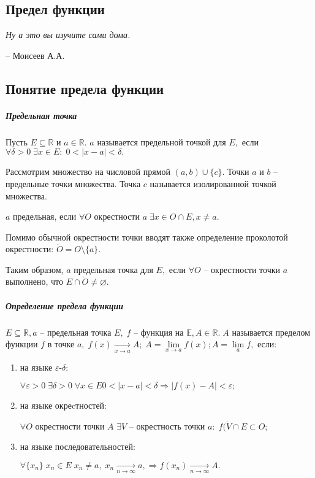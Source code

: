 \begin{center}
\section{\LARGE{\bf Предел функции}}
\end{center}
\epigraph{\textit{Ну а это вы изучите сами дома.}}
{-- Моисеев А.А.}
\subsection{Понятие предела функции}
\subparagraph{Предельная точка}
\begin{Definition}
Пусть $E\subseteq\mathbb{R}$ и $a\in\mathbb{R}.$ $a$ называется предельной точкой для $E,$ если $\forall\delta> 0\;\exists x\in E: \; 0<\mid x-a\mid<\delta.$
\end{Definition}

Рассмотрим множество на числовой прямой $(a, b)\cup\{c\}.$ Точки $a$ и $b$ -- предельные точки множества. Точка $c$ называется изолированной точкой множества.



$a$ предельная, если $\forall O$ окрестности $a \; \exists x\in O\cap E, x \neq a.$

Помимо обычной окрестности точки вводят также определение проколотой окрестности: $\dot{O} = O\setminus\{a\}.$

Таким образом, $a$ предельная точка для $E,$ если $\forall O$ -- окрестности точки $a$ выполнено, что $E\cap\dot{O}\neq\varnothing.$

\subparagraph{Определение предела функции}

\begin{Definition}
$E\subseteq\mathbb{R}, a$ -- предельная точка $E, \; f$ -- функция на $\mathbb{E}, A\in\mathbb{R}. \; A$ называется пределом функции $f$ в точке $a, \;f(x)\xrightarrow[x\rightarrow a]{} A; \; A=\lim\limits_{x\rightarrow a} f(x); A=\lim\limits_{a}f,$ если:
\begin{enumerate}
\item на языке $\varepsilon$-$\delta:$

$\forall \varepsilon > 0 \;\exists \delta > 0\;\forall x\in E 0<\mid x-a\mid<\delta \Rightarrow \mid f(x)-A\mid<\varepsilon;$

\item на языке окреcтностей$:$

$\forall O$ окрестности точки $A$ $\exists V$ -- окрестность точки $a: \; f(\dot{V}\cap E \subset O;$

\item на языке последовательностей$:$

$\forall\{x_n\} \; x_n\in E \; x_n \neq a, \; x_n\xrightarrow[n \rightarrow \infty]{} a,  \Rightarrow f(x_n)\xrightarrow[n\rightarrow\infty]{} A.$
\end{enumerate}
\end{Definition}

